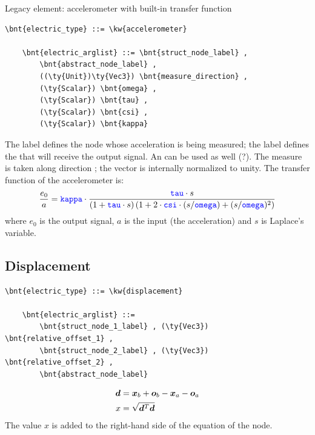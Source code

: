 \noindent
Legacy element: accelerometer with built-in transfer function
\begin{Verbatim}[commandchars=\\\{\}]
    \bnt{electric_type} ::= \kw{accelerometer}

    \bnt{electric_arglist} ::= \bnt{struct_node_label} ,
        \bnt{abstract_node_label} ,
        ((\ty{Unit})\ty{Vec3}) \bnt{measure_direction} ,
        (\ty{Scalar}) \bnt{omega} ,
        (\ty{Scalar}) \bnt{tau} ,
        (\ty{Scalar}) \bnt{csi} ,
        (\ty{Scalar}) \bnt{kappa}	
\end{Verbatim}
The label  defines the node whose acceleration 
is being measured; the label  defines the
 that will receive the output signal. 
An  can be used as well (?).
The measure is taken along direction ;
the vector is internally normalized to unity.
The transfer function of the accelerometer is:
\begin{displaymath}
    \frac{e_0}{a} = \textcolor{blue}{\texttt{kappa}} \cdot \frac{\textcolor{blue}{\texttt{tau}} \cdot s}{
        \left( 1 + \textcolor{blue}{\texttt{tau}} \cdot s \right)
        \left( 1 + 2 \cdot \textcolor{blue}{\texttt{csi}} \cdot (s/\textcolor{blue}{\texttt{omega}}) + (s/\textcolor{blue}{\texttt{omega}})^2 \right)
    }
\end{displaymath}
where $ e_0 $ is the output signal, $ a $ is the input (the acceleration)
and $ s $ is Laplace's variable.



\subsection{Displacement}
\begin{Verbatim}[commandchars=\\\{\}]
    \bnt{electric_type} ::= \kw{displacement}

    \bnt{electric_arglist} ::=
        \bnt{struct_node_1_label} , (\ty{Vec3}) \bnt{relative_offset_1} ,
        \bnt{struct_node_2_label} , (\ty{Vec3}) \bnt{relative_offset_2} ,
        \bnt{abstract_node_label}
\end{Verbatim}
\begin{subequations}
\begin{align}
	\boldsymbol{d} &= \boldsymbol{x}_b + \boldsymbol{o}_b - \boldsymbol{x}_a - \boldsymbol{o}_a \\
	x &= \sqrt{\boldsymbol{d}^T \boldsymbol{d}}
\end{align}
\end{subequations}
The value $x$ is added to the right-hand side of the equation
of the  node.

